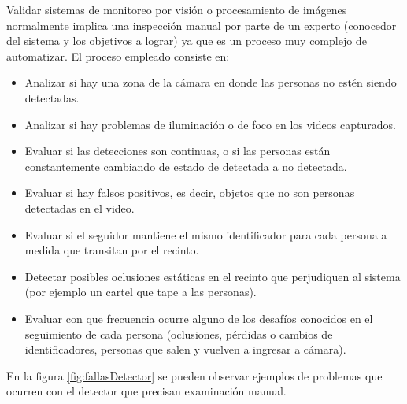 Validar sistemas de monitoreo por visión o procesamiento de imágenes normalmente implica una inspección manual por parte de un experto (conocedor del sistema y los objetivos a lograr) ya que es un proceso muy complejo de automatizar. El proceso empleado consiste en:

\begin{itemize}
\item Analizar si hay una zona de la cámara en donde las personas no estén siendo detectadas.
\item Analizar si hay problemas de iluminación o de foco en los videos capturados.
\item Evaluar si las detecciones son continuas, o si las personas están constantemente cambiando de estado de detectada a no detectada.
\item Evaluar si hay falsos positivos, es decir, objetos que no son personas detectadas en el video.
\item Evaluar si el seguidor mantiene el mismo identificador para cada persona a medida que transitan por el recinto.
\item Detectar posibles oclusiones estáticas en el recinto que perjudiquen al sistema (por ejemplo un cartel que tape a las personas).
\item Evaluar con que frecuencia ocurre alguno de los desafíos conocidos en el seguimiento de cada persona (oclusiones, pérdidas o cambios de identificadores, personas que salen y vuelven a ingresar a cámara).
\end{itemize}

En la figura \ref{fig:fallasDetector} se pueden observar ejemplos de problemas que ocurren con el detector que precisan examinación manual.

